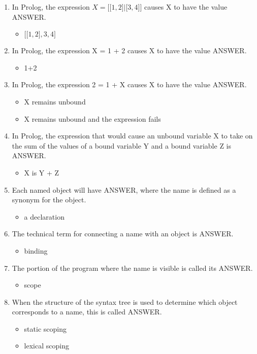 \documentclass{exam}
\begin{document}
\begin{enumerate}
\begin{itemize}
\end{itemize}
\item In Prolog, the expression $X = \lbrack \lbrack 1,2\rbrack | \lbrack 3,4\rbrack \rbrack$ causes X to have the value ANSWER.
\begin{itemize}
\item $\lbrack \lbrack 1, 2\rbrack, 3, 4\rbrack$
\end{itemize}
\item In Prolog, the expression X = 1 + 2 causes X to have the value ANSWER.
\begin{itemize}
\item 1+2
\end{itemize}
\item In Prolog, the expression 2 = 1 + X causes X to have the value ANSWER.
\begin{itemize}
\item X remains unbound
\item X remains unbound and the expression fails
\end{itemize}
\item In Prolog, the expression that would cause an unbound variable X to take on the sum of the values of a bound variable Y and a bound variable Z is ANSWER.
\begin{itemize}
\item X is Y + Z
\end{itemize}
\item Each named object will have ANSWER, where the name is defined as a synonym for the object.
\begin{itemize}
\item a declaration
\end{itemize}
\item The technical term for connecting a name with an object is ANSWER.
\begin{itemize}
\item binding
\end{itemize}
\item The portion of the program where the name is visible is called its ANSWER.
\begin{itemize}
\item scope
\end{itemize}
\item When the structure of the syntax tree is used to determine which object corresponds to a name, this is called ANSWER.
\begin{itemize}
\item static scoping
\item lexical scoping

\end{itemize}
\end{enumerate}
\end{document}
